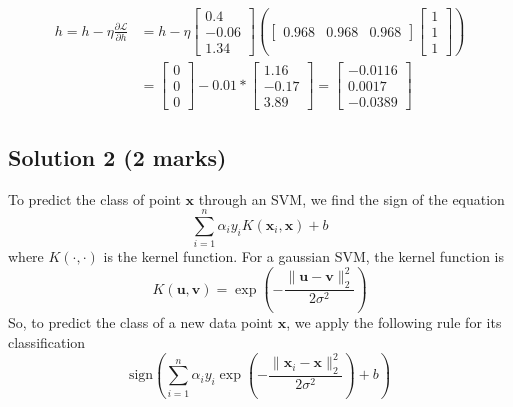 \documentclass[12pt]{article}
\begin{document}
    \begin{align*}
        h = h - \eta \frac{\partial \mathcal{L}}{\partial h} &= h - \eta \begin{bmatrix}
            0.4 \\ -0.06 \\ 1.34
        \end{bmatrix} \left( \begin{bmatrix}
            0.968 & 0.968 & 0.968
        \end{bmatrix} \begin{bmatrix}
            1 \\ 1 \\ 1
        \end{bmatrix} \right) \\ &= \begin{bmatrix}
            0 \\ 0 \\ 0
        \end{bmatrix} - 0.01 * \begin{bmatrix}
            1.16 \\ -0.17 \\ 3.89
        \end{bmatrix} = \begin{bmatrix}
            -0.0116 \\ 0.0017 \\ -0.0389
        \end{bmatrix}
    \end{align*}

    \subsection*{Solution 2 (2 marks)}
    To predict the class of point $\mathbf{x}$ through an SVM, we find the sign of the equation
    \begin{equation}
        \sum_{i=1}^{n} \alpha_{i} y_{i} K(\mathbf{x}_{i}, \mathbf{x}) + b
    \end{equation}
    where $K(\cdot, \cdot)$ is the kernel function. For a gaussian SVM, the kernel
    function is
    \begin{equation}
        K(\mathbf{u}, \mathbf{v}) = \exp\left( - \frac{\lVert \mathbf{u} - \mathbf{v} \rVert_{2}^{2}}{2 \sigma^{2}} \right)
    \end{equation}
    So, to predict the class of a new data point $\mathbf{x}$, we apply the following rule for its classification
    \begin{equation}
        \text{sign} \left( \sum_{i=1}^{n} \alpha_{i} y_{i} \exp\left( - \frac{\lVert \mathbf{x}_{i} - \mathbf{x} \rVert_{2}^{2}}{2 \sigma^{2}} \right) + b \right)
    \end{equation}
\end{document}
